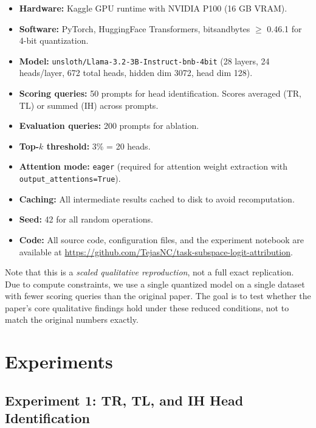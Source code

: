 \documentclass[twoside,english]{article}
\begin{document}
\begin{itemize}
    \item \textbf{Hardware:} Kaggle GPU runtime with NVIDIA P100 (16 GB VRAM).
    \item \textbf{Software:} PyTorch, HuggingFace Transformers, bitsandbytes $\geq$ 0.46.1 for 4-bit quantization.
    \item \textbf{Model:} \texttt{unsloth/Llama-3.2-3B-Instruct-bnb-4bit} (28 layers, 24 heads/layer, 672 total heads, hidden dim 3072, head dim 128).
    \item \textbf{Scoring queries:} 50 prompts for head identification. Scores averaged (TR, TL) or summed (IH) across prompts.
    \item \textbf{Evaluation queries:} 200 prompts for ablation.
    \item \textbf{Top-$k$ threshold:} 3\% = 20 heads.
    \item \textbf{Attention mode:} \texttt{eager} (required for attention weight extraction with \texttt{output\_attentions=True}).
    \item \textbf{Caching:} All intermediate results cached to disk to avoid recomputation.
    \item \textbf{Seed:} 42 for all random operations.
    \item \textbf{Code:} All source code, configuration files, and the experiment notebook are available at \url{https://github.com/TejasNC/task-subspace-logit-attribution}.
\end{itemize}

Note that this is a \emph{scaled qualitative reproduction}, not a full exact replication. Due to compute constraints, we use a single quantized model on a single dataset with fewer scoring queries than the original paper. The goal is to test whether the paper's core qualitative findings hold under these reduced conditions, not to match the original numbers exactly.

\section{Experiments} \label{sec:experiments}

\subsection{Experiment 1: TR, TL, and IH Head Identification}
\end{document}
